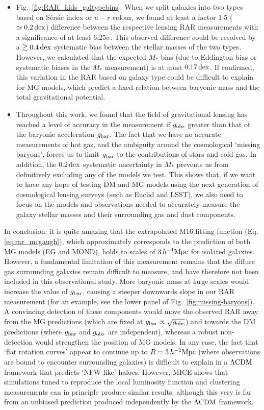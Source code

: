 \documentclass[usenatbib]{mnras}
\newcommand{\hMpc}{\, h^{-1}{\rm{Mpc}} }
\newcommand{\lcdm}{{\rm \Lambda CDM}}
\newcommand{\un}[1]{_{\rm #1}}
\newcommand{\dex}{\, {\rm dex}}
\begin{document}
\begin{itemize}
	\item Fig.~\ref{fig:RAR_kids_galtypebins}: When we split galaxies into two types based on S\'ersic index or $u-r$ colour, we found at least a factor $1.5$ ($\simeq0.2 \dex$) difference between the respective lensing RAR measurements with a significance of at least $6.25 \sigma$. This observed difference could be resolved by a $\gtrsim 0.4 \dex$ systematic bias between the stellar masses of the two types. However, we calculated that the expected $M_*$ bias (due to Eddington bias or systematic biases in the $M_*$ measurement) is at most $0.17 \dex$. If confirmed, this variation in the RAR based on galaxy type could be difficult to explain for MG models, which predict a fixed relation between baryonic mass and the total gravitational potential.
	
	\item Throughout this work, we found that the field of gravitational lensing has reached a level of accuracy in the measurement if $g\un{obs}$ greater than that of the baryonic acceleration $g\un{bar}$. The fact that we have no accurate measurements of hot gas, and the ambiguity around the cosmological `missing baryons', forces us to limit $g\un{bar}$ to the contributions of stars and cold gas. In addition, the $0.2 \dex$ systematic uncertainty in $M_*$ prevents us from definitively excluding any of the models we test. This shows that, if we want to have any hope of testing DM and MG models using the next generation of cosmological lensing surveys (such as Euclid and LSST), we also need to focus on the models and observations needed to accurately measure the galaxy stellar masses and their surrounding gas and dust components.
	
\end{itemize}

In conclusion: it is quite amazing that the extrapolated M16 fitting function (Eq. \ref{eq:rar_mcgaugh}), which approximately corresponds to the prediction of both MG models (EG and MOND), holds to scales of $3 \hMpc$ for isolated galaxies. However, a fundamental limitation of this measurement remains that the diffuse gas surrounding galaxies remain difficult to measure, and have therefore not been included in this observational study. More baryonic mass at large scales would increase the value of $g\un{bar}$, causing a steeper downwards slope in our RAR measurement (for an example, see the lower panel of Fig.~\ref{fig:missing-baryons}). A convincing detection of these components would move the observed RAR away from the MG predictions (which are fixed at $g\un{bar} \propto \sqrt{g\un{obs}}$) and towards the DM predictions (where $g\un{bar}$ and $g\un{obs}$ are independent), whereas a robust non-detection would strengthen the position of MG models. In any case, the fact that `flat rotation curves' appear to continue up to $R=3\hMpc$ (where observations are bound to encounter surrounding galaxies) is difficult to explain in a $\lcdm$ framework that predicts `NFW-like' haloes. However, MICE shows that simulations tuned to reproduce the local luminosity function and clustering measurements can in principle produce similar results, although this very is far from an unbiased prediction produced independently by the $\lcdm$ framework.
\end{document}
